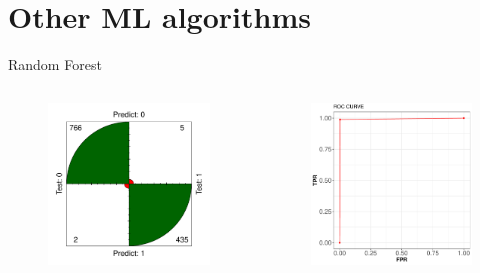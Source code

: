 \documentclass{beamer}
\begin{document}
\section{Other ML algorithms}
\begin{frame}{Random Forest}
\begin{columns}
  \begin{figure}[b]{\textwidth}
    \includegraphics[width=\textwidth]{Pic/RF_confusion.pdf}
  \end{figure} 
  \begin{figure}[b]{\textwidth}
    \includegraphics[width=\textwidth]{Pic/ROC_RF.pdf}
  \end{figure}
\end{columns}
\end{frame}
\end{document}

